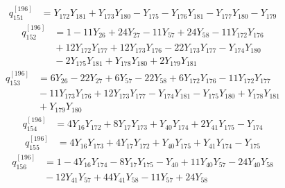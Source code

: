 \begin{equation}\label{q196:row:151}
\begin{aligned}
q_{151}^{[196]} &={} Y_{172}Y_{181} + Y_{173}Y_{180} - Y_{175} - Y_{176}Y_{181} - Y_{177}Y_{180} - Y_{179}
\end{aligned}
\end{equation}
\begin{equation}\label{q196:row:152}
\begin{aligned}
q_{152}^{[196]} &={} 1 - 11Y_{26} + 24Y_{27} - 11Y_{57} + 24Y_{58} - 11Y_{172}Y_{176}\\
&{} + 12Y_{172}Y_{177} + 12Y_{173}Y_{176} - 22Y_{173}Y_{177} - Y_{174}Y_{180}\\
&{} - 2Y_{175}Y_{181} + Y_{178}Y_{180} + 2Y_{179}Y_{181}
\end{aligned}
\end{equation}
\begin{equation}\label{q196:row:153}
\begin{aligned}
q_{153}^{[196]} &={} 6Y_{26} - 22Y_{27} + 6Y_{57} - 22Y_{58} + 6Y_{172}Y_{176} - 11Y_{172}Y_{177}\\
&{} - 11Y_{173}Y_{176} + 12Y_{173}Y_{177} - Y_{174}Y_{181} - Y_{175}Y_{180} + Y_{178}Y_{181}\\
&{} + Y_{179}Y_{180}
\end{aligned}
\end{equation}
\begin{equation}\label{q196:row:154}
\begin{aligned}
q_{154}^{[196]} &={} 4Y_{16}Y_{172} + 8Y_{17}Y_{173} + Y_{40}Y_{174} + 2Y_{41}Y_{175} - Y_{174}
\end{aligned}
\end{equation}
\begin{equation}\label{q196:row:155}
\begin{aligned}
q_{155}^{[196]} &={} 4Y_{16}Y_{173} + 4Y_{17}Y_{172} + Y_{40}Y_{175} + Y_{41}Y_{174} - Y_{175}
\end{aligned}
\end{equation}
\begin{equation}\label{q196:row:156}
\begin{aligned}
q_{156}^{[196]} &={} 1 - 4Y_{16}Y_{174} - 8Y_{17}Y_{175} - Y_{40} + 11Y_{40}Y_{57} - 24Y_{40}Y_{58}\\
&{} - 12Y_{41}Y_{57} + 44Y_{41}Y_{58} - 11Y_{57} + 24Y_{58}
\end{aligned}
\end{equation}
